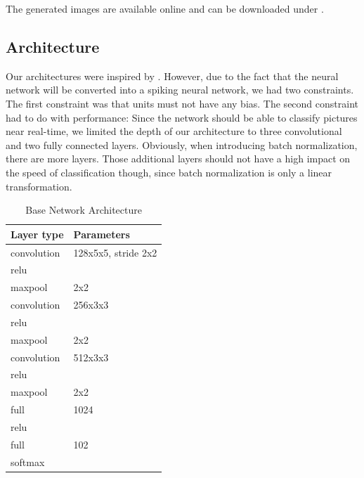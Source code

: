 \documentclass[a4paper, 11pt]{article}
\begin{document}
The generated images are available online and can be downloaded under \cite{UnternaehrerGenImg}.


\subsection{Architecture}
Our architectures were inspired by \citet{Simonyan2015}.
However, due to the fact that the neural network will be converted into a spiking neural network, we had two constraints.
The first constraint was that units must not have any bias.
The second constraint had to do with performance: Since the network should be able to classify pictures near real-time, we limited the depth of our architecture to three convolutional and two fully connected layers.
Obviously, when introducing batch normalization, there are more layers.
Those additional layers should not have a high impact on the speed of classification though, since batch normalization is only a linear transformation.

\begin{table}[!h]
	\begin{center}
		\begin{tabularx}{.5\linewidth}{|X|l|}
			\hline \textbf{Layer type} & \textbf{Parameters} \\ 
			\hline convolution & 128x5x5, stride 2x2 \\ 
			\hline relu &\\
			\hline maxpool &  2x2\\ 
			\hline convolution & 256x3x3 \\ 
			\hline relu &\\
			\hline maxpool &  2x2\\ 
			\hline convolution & 512x3x3 \\ 
			\hline relu &\\
			\hline maxpool &  2x2\\ 
			\hline full &  1024 \\ 
			\hline relu &\\
			\hline full &  102 \\
			\hline softmax & \\
			\hline
		\end{tabularx}
	\end{center}
	\caption{Base Network Architecture}
	\label{tab:base-arch}
\end{table}
\end{document}
